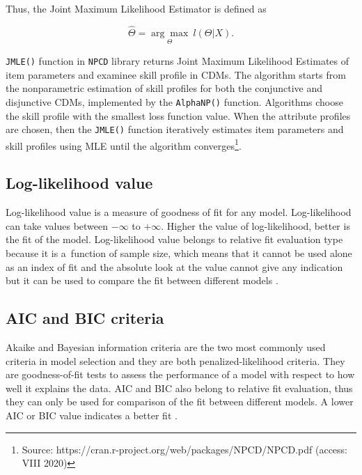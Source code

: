 \documentclass[english]{pwr_wmat_praca_dyplomowa}
\theoremstyle{plain}
\numberwithin{theorem}{chapter}
\theoremstyle{definition}
\numberwithin{theorem}{chapter}
\begin{document}
	\noindent Thus, the Joint Maximum Likelihood Estimator is defined \cite{jmle2} as
	
	\begin{equation}
	\hat{\Theta} = \underset{\Theta}{\arg\max} \: l(\Theta|X). 
	\end{equation}
	
	\texttt{JMLE()} function in \texttt{NPCD} library returns Joint Maximum Likelihood Estimates of item parameters and examinee skill profile in CDMs. The algorithm starts from the nonparametric estimation of skill profiles for both the conjunctive and disjunctive CDMs, implemented by the \texttt{AlphaNP()} function. Algorithms choose the skill profile with the smallest loss function value. When the attribute profiles are chosen, then the \texttt{JMLE()} function iteratively estimates item parameters and skill profiles using MLE until the algorithm converges\footnote{Source: https://cran.r-project.org/web/packages/NPCD/NPCD.pdf (access: VIII 2020)}.
	
	\subsection{Log-likelihood value}
	
	Log-likelihood value is a measure of goodness of fit for any model. Log-likelihood can take values between $-\infty$ to $+\infty$. Higher the value of log-likelihood, better is the fit of the model. Log-likelihood value belongs to relative fit evaluation type because it is a~function of sample size, which means that it cannot be used alone as an index of fit and the absolute look at the value cannot give any indication but it can be used to compare the fit between different models \cite{statistics}. %
	
	\subsection{AIC and BIC criteria}
	
	Akaike and Bayesian information criteria are the two most commonly used criteria in model
	selection and they are both penalized-likelihood criteria. They are goodness-of-fit tests to assess the
	performance of a model with respect to how well it explains the data. AIC and BIC also belong to relative fit evaluation, thus they can only be used for comparison of the fit between different models. A lower AIC or BIC value indicates a better fit \cite{aic_bic}.
	
\end{document}
